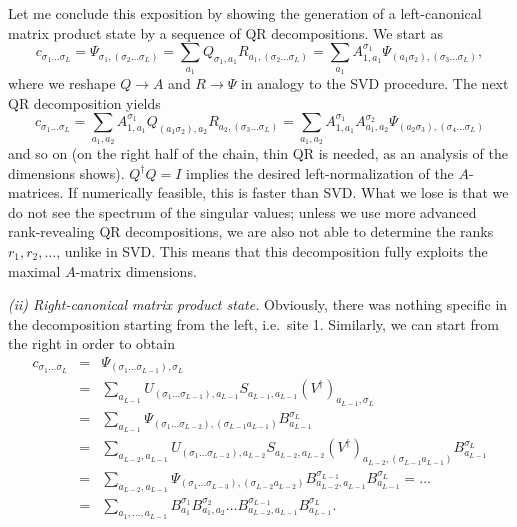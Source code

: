 \documentclass[a4paper,10pt,oneside,onecolumn,1p,times]{elsarticle}
\begin{document}
Let me conclude this exposition by showing the generation of a left-canonical matrix product state by a sequence of QR decompositions. We start as
\begin{equation}
c_{\sigma_1\ldots\sigma_L} = \Psi_{\sigma_1,(\sigma_2\ldots\sigma_L)} =
\sum_{a_1} Q_{\sigma_1,a_1} R_{a_1,(\sigma_2\ldots\sigma_L)} =
\sum_{a_1} A^{\sigma_1}_{1,a_1} \Psi_{(a_1\sigma_2),(\sigma_3\ldots\sigma_L)},
\end{equation}
where we reshape $Q\rightarrow A$ and $R\rightarrow \Psi$ in analogy to the SVD procedure. The next QR decomposition yields
\begin{equation}
c_{\sigma_1\ldots\sigma_L} = \sum_{a_1,a_2} A^{\sigma_1}_{1,a_1} Q_{(a_1\sigma_2),a_2} R_{a_2,(\sigma_3\ldots\sigma_L)} = \sum_{a_1,a_2} A^{\sigma_1}_{1,a_1} A^{\sigma_2}_{a_1,a_2} \Psi_{(a_2\sigma_3),(\sigma_4\ldots\sigma_L)}
\end{equation}
and so on (on the right half of the chain, thin QR is needed, as an analysis of the dimensions shows). $Q^\dagger Q=I$ implies the desired left-normalization of the $A$-matrices. If numerically feasible, this is faster than SVD. What we lose is that we do not see the spectrum of the singular values; unless we use more advanced rank-revealing QR decompositions, we are also not able to determine the ranks $r_1, r_2, \ldots$, unlike in SVD. This means that this decomposition fully exploits the maximal $A$-matrix dimensions.

{\em (ii) Right-canonical matrix product state.} Obviously, there was nothing specific in the decomposition starting from the left, i.e.\ site 1. Similarly, we can start from the right in order to obtain
\begin{eqnarray*}
c_{\sigma_1 \ldots \sigma_L} &=& \Psi_{(\sigma_1 \ldots \sigma_{L-1}), \sigma_L} \\
&=& \sum_{a_{L-1}} U_{(\sigma_1 \ldots \sigma_{L-1}), a_{L-1}} S_{a_{L-1},a_{L-1}} (V^\dagger)_{a_{L-1},\sigma_L} \\
&=& \sum_{a_{L-1}} \Psi_{(\sigma_1 \ldots \sigma_{L-2}),(\sigma_{L-1} a_{L-1})} B^{\sigma_L}_{a_{L-1}} \\
&=& \sum_{a_{L-2}, a_{L-1}} U_{(\sigma_1 \ldots \sigma_{L-2}), a_{L-2}} S_{a_{L-2},a_{L-2}} (V^\dagger)_{a_{L-2},(\sigma_{L-1}a_{L-1})} B^{\sigma_L}_{a_{L-1}} \\
&=& \sum_{a_{L-2}, a_{L-1}} \Psi_{(\sigma_1 \ldots \sigma_{L-3}), (\sigma_{L-2} a_{L-2})} B^{\sigma_{L-1}}_{a_{L-2},a_{L-1}} B^{\sigma_L}_{a_{L-1}} = \ldots \\
&=& \sum_{a_{1},\ldots, a_{L-1}} B^{\sigma_1}_{a_{1}} B^{\sigma_{2}}_{a_{1},a_{2}} \ldots B^{\sigma_{L-1}}_{a_{L-2},a_{L-1}} B^{\sigma_L}_{a_{L-1}}.
\end{eqnarray*}
\end{document}
